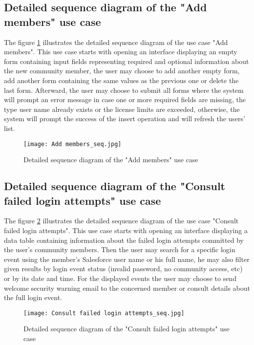 \subsection{Detailed sequence diagram of the "Add members" use case}
The figure \ref{addmembers_seq} illustrates the detailed sequence diagram of the use case
"Add members".
This use case starts with opening an interface displaying an empty form containing input fields representing required and optional information about the new community member, the user may choose to add another empty form, add another form containing the same values as the previous one or delete the last form. Afterward, the user may choose to submit all forms where the system will prompt an error message in case one or more required fields are missing, the type user name already exists or the license limits are exceeded, otherwise, the system will prompt the success of the insert operation and will refresh the users' list. 
 \begin{figure}[H]%
    \center   
    \texttt{[image: Add members\_seq.jpg]}
    \caption{Detailed sequence diagram of the "Add members" use case}
    \label{addmembers_seq}
\end{figure}

\subsection{Detailed sequence diagram of the "Consult failed login attempts" use case}
The figure \ref{loginattempts_seq} illustrates the detailed sequence diagram of the use case
"Consult failed login attempts".
This use case starts with opening an interface displaying a data table containing information about the failed login attempts committed by the user's community members. Then the user may search for a specific login event using the member's Salesforce user name or his full name, he may also filter given results by login event status (invalid password, no community access, etc) or by its date and time. For the displayed events the user may choose to send welcome security warning email to the concerned member or consult details about the full login event.
\begin{figure}[H]%
    \center   
    \texttt{[image: Consult failed login attempts\_seq.jpg]}
    \caption{Detailed sequence diagram of the "Consult failed login attempts" use case}
    \label{loginattempts_seq}
\end{figure}
